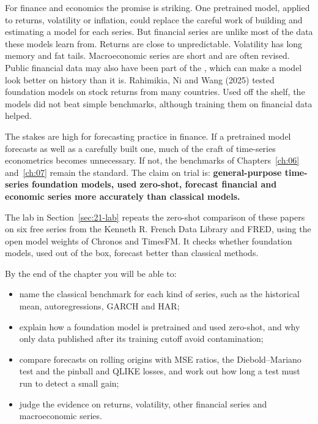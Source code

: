 For finance and economics the promise is striking. One pretrained model, applied to returns, volatility or inflation, could replace the careful work of building and estimating a model for each series. But financial series are unlike most of the data these models learn from. Returns are close to unpredictable. Volatility has long memory and fat tails. Macroeconomic series are short and are often revised. Public financial data may also have been part of the , which can make a model look better on history than it is. Rahimikia, Ni and Wang (2025) tested foundation models on stock returns from many countries. Used off the shelf, the models did not beat simple benchmarks, although training them on financial data helped.

The stakes are high for forecasting practice in finance. If a pretrained model forecasts as well as a carefully built one, much of the craft of time-series econometrics becomes unnecessary. If not, the benchmarks of Chapters~\ref{ch:06} and~\ref{ch:07} remain the standard. The claim on trial is: \textbf{general-purpose time-series foundation models, used zero-shot, forecast financial and economic series more accurately than classical models.}

The lab in Section~\ref{sec:21-lab} repeats the zero-shot comparison of these papers on six free series from the Kenneth R. French Data Library and FRED, using the open model weights of Chronos and TimesFM. It checks whether foundation models, used out of the box, forecast better than classical methods.

By the end of the chapter you will be able to:

\begin{itemize}
  \item name the classical benchmark for each kind of series, such as the historical mean, autoregressions, GARCH and HAR;
  \item explain how a foundation model is pretrained and used zero-shot, and why only data published after its training cutoff avoid contamination;
  \item compare forecasts on rolling origins with MSE ratios, the Diebold--Mariano test and the pinball and QLIKE losses, and work out how long a test must run to detect a small gain;
  \item judge the evidence on returns, volatility, other financial series and macroeconomic series.
\end{itemize}



